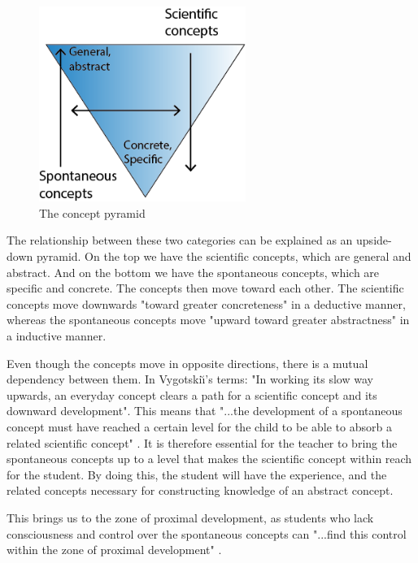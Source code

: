 \begin{figure}
\centering
\includegraphics[width=0.6\textwidth]{img/theoretical/conceptpyramid.png}
\caption{The concept pyramid}
\label{fig:conceptpyramid}
\end{figure}

The relationship between these two categories can be explained as an upside-down pyramid. On the top we have the scientific concepts, which are general and abstract. And on the bottom we have the spontaneous concepts, which are specific and concrete. The concepts then move toward each other. The scientific concepts move downwards "toward greater concreteness" in a deductive manner, whereas the spontaneous concepts move "upward toward greater abstractness" \citep{vygotsky2012thought} in a inductive manner.

Even though the concepts move in opposite directions, there is a mutual dependency between them. In Vygotski{\u\i}'s terms: "In working its slow way upwards, an everyday concept clears a path for a scientific concept and its downward development". This means that "...the development of a spontaneous concept must have reached a certain level for the child to be able to absorb a related scientific concept" \citep{vygotsky2012thought}. It is therefore essential for the teacher to bring the spontaneous concepts up to a level that makes the scientific concept within reach for the student. By doing this, the student will have the experience, and the related concepts necessary for constructing knowledge of an abstract concept. 

This brings us to the zone of proximal development, as students who lack consciousness and control over the spontaneous concepts can "...find this control within the zone of proximal development" \citep{vygotsky2012thought}.

